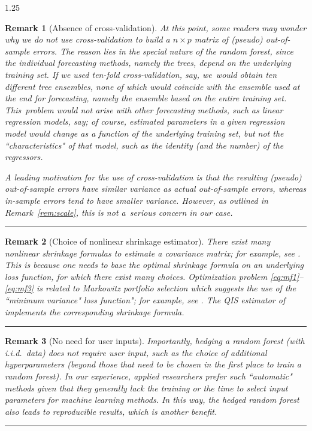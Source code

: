 \documentclass[12pt]{article}
\newtheorem{remark}{Remark}[section]
\numberwithin{equation}{section}
\theoremstyle{plain}
\def\qed{\rule{2mm}{2mm}}
\begin{document}
\begin{spacing}{1.25}
\begin{remark}[Absence of cross-validation]
\label{rem:cv}
\rm     
At this point, some readers may wonder why we do not use
cross-validation to build a $n \times p$ matrix of
(pseudo) out-of-sample errors. The reason lies in the special nature
of the random forest, since the individual forecasting methods, namely
the trees, depend on the underlying training set. If we used ten-fold
cross-validation, say, we~would obtain ten different tree ensembles,
none of which would coincide with the ensemble used at the end for
forecasting, namely the ensemble based on the entire training set.
This~problem would not arise with other forecasting methods, such as
linear regression models, say; of course, estimated parameters in
a given regression model would change
as a function of the underlying training set, but not the
``characteristics" of that model, such as the identity (and the number) of the regressors.

A leading motivation for the use of cross-validation is that the
resulting (pseudo) out-of-sample errors have similar variance as actual
out-of-sample errors, whereas in-sample errors tend to have smaller
variance. However, as outlined in Remark~\ref{rem:scale}, this is not
a~serious concern in our case.~\qed
\end{remark}  

\begin{remark}[Choice of nonlinear shrinkage estimator]
\label{rem:nl-formula}
\rm
There exist many nonlinear shrinkage formulas to estimate a covariance matrix; for example, see \cite{ledoit:wolf:2021}. This is because one needs to base the optimal shrinkage formula on an underlying loss function, for which there exist many choices. Optimization problem \eqref{eq:mf1}--\eqref{eq:mf3} is related 
to Markowitz portfolio selection which suggests the use of the ``minimum variance" loss function";
for example, see \citet[Table 1]{ledoit:wolf:2021}. The QIS estimator of 
\cite{ledoit:wolf:2022} implements the corresponding shrinkage formula.~\qed
\end{remark}

\begin{remark}[No need for user inputs]
\label{rem:no-need}
\rm
Importantly, hedging a random forest (with i.i.d.~data) does not require user input, such as the choice of additional hyperparameters (beyond those that need to be chosen in the first place to train a random forest). In our experience, applied researchers prefer such ``automatic" methods given that they generally lack the training or the time to select input parameters for machine learning methods. In this way, the hedged random forest also leads to reproducible results, which is another benefit.~\qed
\end{remark}


\end{spacing}
\end{document}
